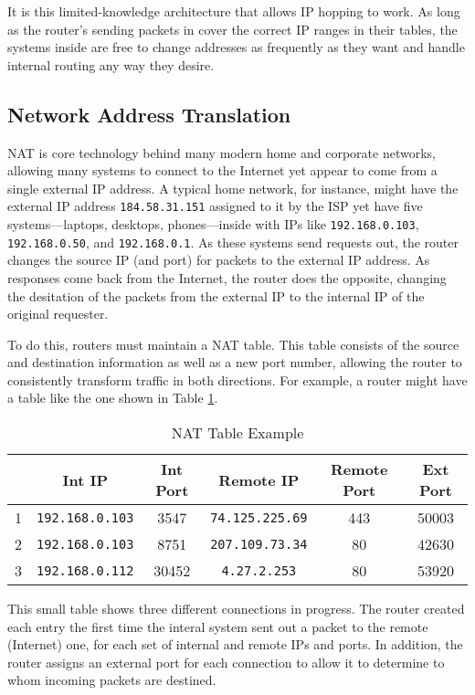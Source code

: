 \par It is this limited-knowledge architecture that allows IP hopping to work. As long as the router's sending packets in cover the correct \ac{IP} ranges in their tables, the systems inside are free to change addresses as frequently as they want and handle internal routing any way they desire.

\subsection{Network Address Translation}
\label{sec:nat}
\par \ac{NAT} is core technology behind many modern home and corporate networks, allowing many systems to connect to the Internet yet appear to come from a single external \ac{IP} address. A typical home network, for instance, might have the external IP address \texttt{184.58.31.151} assigned to it by the \ac{ISP} yet have five systems---laptops, desktops, phones---inside with \acp{IP} like \texttt{192.168.0.103}, \texttt{192.168.0.50}, and \texttt{192.168.0.1}. As these systems send requests out, the router changes the source IP (and port) for packets to the external IP address. As responses come back from the Internet, the router does the opposite, changing the desitation of the packets from the external IP to the internal IP of the original requester.

\par To do this, routers must maintain a \ac{NAT} table. This table consists of the source and destination information as well as a new port number, allowing the router to consistently transform traffic in both directions. For example, a router might have a table like the one shown in Table \ref{tab:nat_example}.

\begin{table}
\caption{NAT Table Example}
\label{tab:nat_example}
\centering
\begin{tabular}{r|ccccc}
  & Int IP & Int Port & Remote IP & Remote Port & Ext Port\\
\hline
1 & \texttt{192.168.0.103} & 3547 & \texttt{74.125.225.69} & 443 & 50003\\
2 & \texttt{192.168.0.103} & 8751 & \texttt{207.109.73.34} & 80 & 42630\\
3 & \texttt{192.168.0.112} & 30452 & \texttt{4.27.2.253} & 80 & 53920
\end{tabular}
\end{table}

\par This small table shows three different connections in progress. The router created each entry the first time the interal system sent out a packet to the remote (Internet) one, for each set of internal and remote IPs and ports. In addition, the router assigns an external port for each connection to allow it to determine to whom incoming packets are destined.

